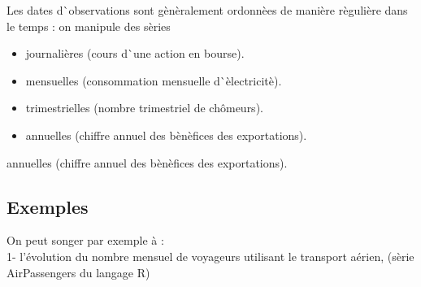\documentclass[a4paper,12pt,freqn]{report}
\theoremstyle{plain}
\begin{document}
\begin{Remark} 
 Les dates d\`{}observations sont g\`{e}n\`{e}ralement ordonn\`{e}es de manière r\`{e}gulière dans le temps : on manipule des s\`{e}ries
 \begin{itemize}
   \item  journali\`{e}res (cours d\`{}une action en bourse).
   \item  mensuelles (consommation mensuelle d\`{}\`{e}lectricit\`{e}).
   \item  trimestrielles (nombre trimestriel de ch\^{o}meurs).
   \item  annuelles (chiffre annuel des b\`{e}n\`{e}fices des exportations).
 \end{itemize}
\end{Remark}


annuelles (chiffre annuel des b\`{e}n\`{e}fices des exportations).

\subsection{Exemples}
On peut songer par exemple \`{a} : \\
1- l'\'{e}volution du nombre mensuel de voyageurs utilisant le  transport a\'{e}rien, (s\`{e}rie AirPassengers du langage R)\\
\end{document}
